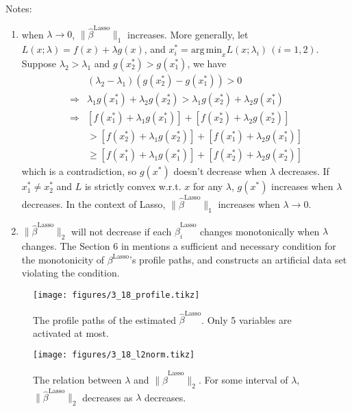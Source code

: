 \begin{sol}
\begin{enumerate}
Notes:
\begin{enumerate}
	\item when $\lambda\to 0$, $\|\hat{\beta}^{\mathrm{Lasso}}\|_1$ increases. More generally, let $L(x;\lambda)=f(x)+\lambda g(x)$, and $x_i^*=\mathrm{arg\,min}_xL(x;\lambda_i)\,(i=1,2)$. Suppose $\lambda_2>\lambda_1$ and $g(x_2^*)>g(x_1^*)$, we have
	\begin{align*}
	&(\lambda_2-\lambda_1)(g(x_2^*)-g(x_1^*))>0\\
	\Longrightarrow & \lambda_1g(x_1^*)+\lambda_2g(x_2^*)>\lambda_1g(x_2^*)+\lambda_2g(x_1^*)\\
	\Longrightarrow & [f(x_1^*)+\lambda_1g(x_1^*)]+[f(x_2^*)+\lambda_2g(x_2^*)]\\
	&>[f(x_2^*)+\lambda_1g(x_2^*)]+[f(x_1^*)+\lambda_2g(x_1^*)] \\
	&\ge [f(x_1^*)+\lambda_1g(x_1^*)]+[f(x_2^*)+\lambda_2g(x_2^*)]
	\end{align*}
	which is a contradiction, so $g(x^*)$ doesn't decrease when $\lambda$ decreases. If $x_1^*\ne x_2^*$ and $L$ is strictly convex w.r.t. $x$ for any $\lambda$, $g(x^*)$ increases when $\lambda$ decreases. In the context of Lasso, $\|\hat{\beta}^{\mathrm{Lasso}}\|_1$ increases when $\lambda\to 0$.
	\item $\|\hat{\beta}^{\mathrm{Lasso}}\|_2$ will not decrease if each $\hat{\beta}^{\mathrm{Lasso}}_i$ changes monotonically when $\lambda$ changes. The Section 6 in \cite{hastie2007} mentions a sufficient and necessary condition for the monotonicity of $\beta^\mathrm{Lasso}$'s profile paths, and constructs an artificial data set violating the condition. 
\end{enumerate}

 

\begin{figure}[!ht]
	\centering
	\texttt{[image: figures/3\_18\_profile.tikz]}
	\caption{The profile paths of the estimated $\hat{\beta}^{\mathrm{Lasso}}$. Only 5 variables are activated at most.}
	\label{fig:3-18-profile}
\end{figure}
\begin{figure}[!ht]
	\centering
	\texttt{[image: figures/3\_18\_l2norm.tikz]}
	\caption{The relation between $\lambda$ and $\|\hat{\beta}^{\mathrm{Lasso}}\|_2$. For some interval of $\lambda$, $\|\hat{\beta}^{\mathrm{Lasso}}\|_2$ decreases as $\lambda$ decreases.}
	\label{fig:3-18-l2norm}
\end{figure}
\end{enumerate}
\end{sol}

